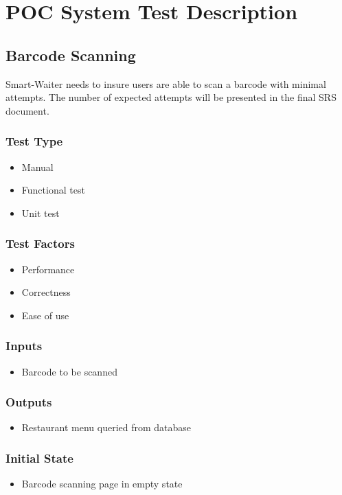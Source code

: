 \documentclass[12pt]{article}
\begin{document}
%
%

\section{POC System Test Description}


\subsection{Barcode Scanning}
Smart-Waiter needs to insure users are able to scan a barcode with minimal attempts. The number of expected attempts will be presented in the final SRS document.

\subsubsection{Test Type}
\begin{itemize}
  \item Manual
  \item Functional test
  \item Unit test
\end{itemize}

\subsubsection{Test Factors}
\begin{itemize}
  \item Performance
  \item 	Correctness
  \item 	Ease of use
\end{itemize}

\subsubsection{Inputs}
\begin{itemize}
  \item Barcode to be scanned
\end{itemize}
\subsubsection{Outputs}
\begin{itemize}
  \item Restaurant menu queried from database
\end{itemize}
\subsubsection{Initial State}
\begin{itemize}
  \item Barcode scanning page in empty state
\end{itemize}
\end{document}
